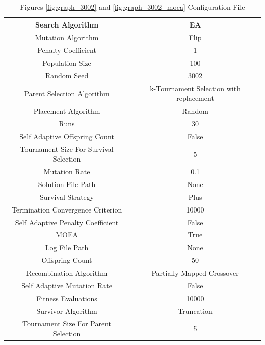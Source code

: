 \documentclass{standalone}
\begin{document}
\begin{table}[!htb]
	\centering
	\caption{Figures \ref{fig:graph_3002} and \ref{fig:graph_3002_moea} Configuration File}
	\label{tab:graph_3002}
	\begin{tabular}{| c | c |}
		\hline
		Search Algorithm		& EA		 \\
		\hline
		Mutation Algorithm		& Flip		 \\
		\hline
		Penalty Coefficient		& 1		 \\
		\hline
		Population Size		& 100		 \\
		\hline
		Random Seed		& 3002		 \\
		\hline
		Parent Selection Algorithm		& k-Tournament Selection with replacement		 \\
		\hline
		Placement Algorithm		& Random		 \\
		\hline
		Runs		& 30		 \\
		\hline
		Self Adaptive Offspring Count		& False		 \\
		\hline
		Tournament Size For Survival Selection		& 5		 \\
		\hline
		Mutation Rate		& 0.1		 \\
		\hline
		Solution File Path		& None		 \\
		\hline
		Survival Strategy		& Plus		 \\
		\hline
		Termination Convergence Criterion		& 10000		 \\
		\hline
		Self Adaptive Penalty Coefficient		& False		 \\
		\hline
		MOEA		& True		 \\
		\hline
		Log File Path		& None		 \\
		\hline
		Offspring Count		& 50		 \\
		\hline
		Recombination Algorithm		& Partially Mapped Crossover		 \\
		\hline
		Self Adaptive Mutation Rate		& False		 \\
		\hline
		Fitness Evaluations		& 10000		 \\
		\hline
		Survivor Algorithm		& Truncation		 \\
		\hline
		Tournament Size For Parent Selection		& 5		 \\
		\hline
	\end{tabular}
\end{table}
\end{document}
